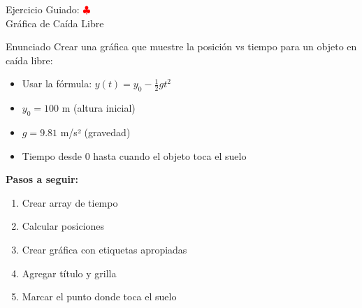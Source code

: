 \documentclass[10pt]{beamer}
\begin{document}
\begin{frame}{Ejercicio Guiado: \hfill \textcolor{red}{$\clubsuit$} \\ Gráfica de Caída Libre}
  \footnotesize
  \begin{block}{Enunciado}
    Crear una gráfica que muestre la posición vs tiempo para un objeto en caída libre:
    \begin{itemize}
      \setlength{\itemsep}{0.1em}
      \item Usar la fórmula: \(y(t) = y_0 - \frac{1}{2}gt^2\)
      \item \(y_0 = 100\) m (altura inicial)
      \item \(g = 9.81\) m/s² (gravedad)
      \item Tiempo desde 0 hasta cuando el objeto toca el suelo
    \end{itemize}
  \end{block}
  
  \textbf{Pasos a seguir:}
  \begin{enumerate}
    \setlength{\itemsep}{0.1em}
    \item Crear array de tiempo
    \item Calcular posiciones
    \item Crear gráfica con etiquetas apropiadas
    \item Agregar título y grilla
    \item Marcar el punto donde toca el suelo
  \end{enumerate}
\end{frame}
\end{document}
